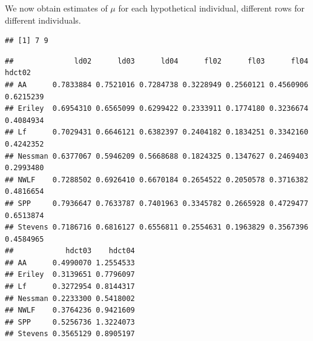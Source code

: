 \documentclass[
  ignorenonframetext,
]{beamer}
\newenvironment{Shaded}{\begin{snugshade}}{\end{snugshade}}
\newcommand{\AttributeTok}[1]{\textcolor[rgb]{0.77,0.63,0.00}{#1}}
\newcommand{\FunctionTok}[1]{\textcolor[rgb]{0.00,0.00,0.00}{#1}}
\newcommand{\NormalTok}[1]{#1}
\newcommand{\OtherTok}[1]{\textcolor[rgb]{0.56,0.35,0.01}{#1}}
\newcommand{\SpecialCharTok}[1]{\textcolor[rgb]{0.00,0.00,0.00}{#1}}
\begin{document}
\begin{frame}[fragile]{}
\protect\hypertarget{section-34}{}
We now obtain estimates of \(\mu\) for each hypothetical individual,
different rows for different individuals.

\vspace{12pt}
\tiny

\begin{Shaded}
\end{Shaded}

\begin{verbatim}
## [1] 7 9
\end{verbatim}

\begin{Shaded}
\end{Shaded}

\begin{verbatim}
##              ld02      ld03      ld04      fl02      fl03      fl04    hdct02
## AA      0.7833884 0.7521016 0.7284738 0.3228949 0.2560121 0.4560906 0.6215239
## Eriley  0.6954310 0.6565099 0.6299422 0.2333911 0.1774180 0.3236674 0.4084934
## Lf      0.7029431 0.6646121 0.6382397 0.2404182 0.1834251 0.3342160 0.4242352
## Nessman 0.6377067 0.5946209 0.5668688 0.1824325 0.1347627 0.2469403 0.2993480
## NWLF    0.7288502 0.6926410 0.6670184 0.2654522 0.2050578 0.3716382 0.4816654
## SPP     0.7936647 0.7633787 0.7401963 0.3345782 0.2665928 0.4729477 0.6513874
## Stevens 0.7186716 0.6816127 0.6556811 0.2554631 0.1963829 0.3567396 0.4584965
##            hdct03    hdct04
## AA      0.4990070 1.2554533
## Eriley  0.3139651 0.7796097
## Lf      0.3272954 0.8144317
## Nessman 0.2233300 0.5418002
## NWLF    0.3764236 0.9421609
## SPP     0.5256736 1.3224073
## Stevens 0.3565129 0.8905197
\end{verbatim}
\end{frame}
\end{document}
